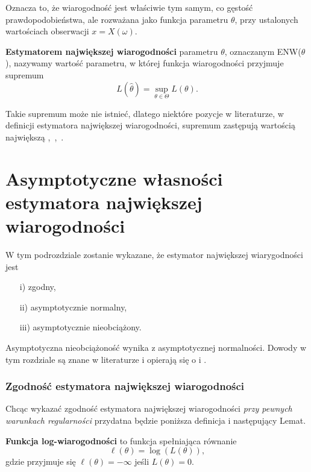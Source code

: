 Oznacza to, że wiarogodność jest właściwie tym samym, co gęstość prawdopodobieństwa,
ale rozważana jako funkcja parametru $\theta$, przy ustalonych wartościach obserwacji
$x = X(\omega)$.


\begin{definition}
\textbf{Estymatorem największej wiarogodności} parametru $\theta$, oznaczanym ENW($\theta$), nazywamy wartość parametru, w której funkcja
wiarogodności przyjmuje supremum $$L(\hat{\theta}) = \sup_{\theta \in \Theta} L(\theta).$$

\end{definition}

Takie supremum może nie istnieć, dlatego niektóre pozycje w literaturze, w definicji estymatora największej wiarogodności, supremum zastępują wartością największą \cite{rydl1},~\cite{sfu1},~\cite{mit0}.

\section{Asymptotyczne własności estymatora największej wiarogodności}

W tym podrozdziale zostanie wykazane, że estymator największej wiarygodności jest
\begin{enumerate}
\item[i)] zgodny,
\item[ii)] asymptotycznie normalny,
\item[iii)] asymptotycznie nieobciążony.
\end{enumerate}

Asymptotyczna nieobciążoność wynika z asymptotycznej normalności. \newline
Dowody w tym rozdziale są znane w literaturze i opierają się o \cite{mit1} i \cite{sfu1}.



\subsubsection{Zgodność estymatora największej wiarogodności}

Chcąc wykazać zgodność estymatora największej wiarogodności \textit{przy pewnych warunkach regularności}
przydatna będzie poniższa definicja i następujący Lemat.
\begin{definition}
\textbf{Funkcja log-wiarogodności} to funkcja spełniająca równanie
$$\ell(\theta) = \log(L(\theta)),$$
gdzie przyjmuje się $\ell(\theta) = -\infty$ jeśli $L(\theta) = 0$.
\end{definition}

